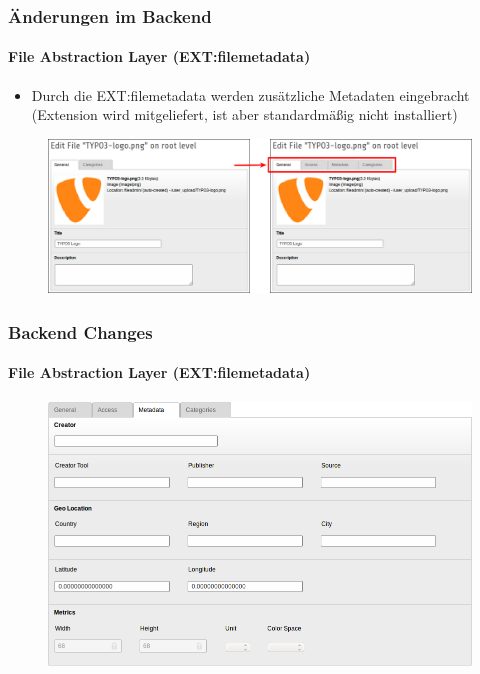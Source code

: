
\begin{frame}[fragile]
	\frametitle{Änderungen im Backend}
	\framesubtitle{File Abstraction Layer (EXT:filemetadata)}

	\begin{itemize}
		\item Durch die EXT:filemetadata werden zusätzliche Metadaten eingebracht\newline
			\smaller(Extension wird mitgeliefert, ist aber standardmäßig nicht installiert)\normalsize
	\end{itemize}

	\begin{figure}
		\includegraphics[width=0.95\linewidth]{Images/BackendChanges/FileMetaDataTabs.png}
	\end{figure}

\end{frame}


\begin{frame}[fragile]
	\frametitle{Backend Changes}
	\framesubtitle{File Abstraction Layer (EXT:filemetadata)}

	\begin{figure}
		\includegraphics[width=0.8\linewidth]{Images/BackendChanges/FileMetaData.png}
	\end{figure}

\end{frame}

